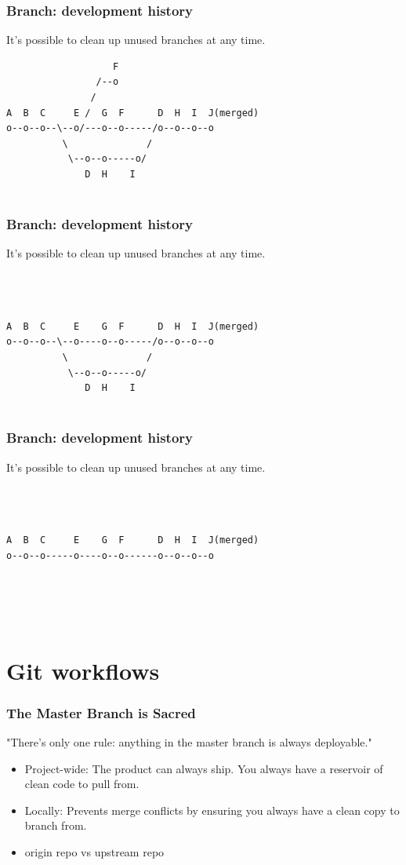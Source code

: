 \documentclass[unknownkeysallowed]{beamer}
\begin{document}
\begin{frame}[fragile]
	\frametitle{Branch: development history}
	It's possible to clean up unused branches at any time.
\begin{verbatim}
                   F
                /--o
               /
A  B  C     E /  G  F      D  H  I  J(merged)
o--o--o--\--o/---o--o-----/o--o--o--o
          \              /
           \--o--o-----o/
              D  H    I
                      
\end{verbatim}
\end{frame}

\begin{frame}[fragile]
	\frametitle{Branch: development history}
	It's possible to clean up unused branches at any time.
\begin{verbatim}
                   
                
               
A  B  C     E    G  F      D  H  I  J(merged)
o--o--o--\--o----o--o-----/o--o--o--o
          \              /
           \--o--o-----o/
              D  H    I
                      
\end{verbatim}
\end{frame}

\begin{frame}[fragile]
	\frametitle{Branch: development history}
	It's possible to clean up unused branches at any time.
\begin{verbatim}
                   
                
               
A  B  C     E    G  F      D  H  I  J(merged)
o--o--o-----o----o--o------o--o--o--o
          
          
          
                      
\end{verbatim}
\end{frame}

\section{Git workflows}
\begin{frame}
    \frametitle{The Master Branch is Sacred}
    "There's only one rule: anything in the master branch is always deployable."
    \vspace{0.25cm}
    \begin{itemize}
        \item{Project-wide: The product can always ship. You always have a reservoir of clean code to pull from.}
        \item{Locally: Prevents merge conflicts by ensuring you always have a clean copy to branch from.}
        \item{origin repo vs upstream repo}
    \end{itemize}
\end{frame}
\end{document}
